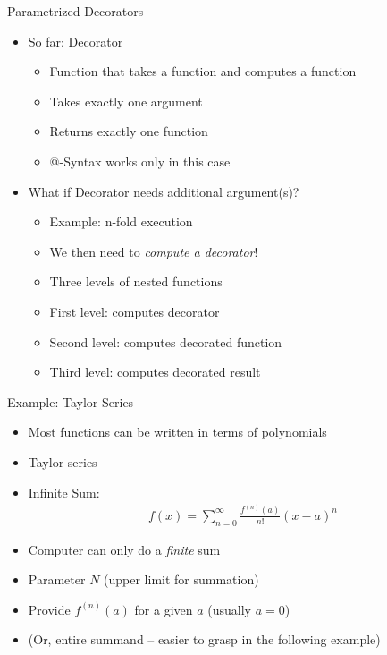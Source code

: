 \begin{frame}[fragile]{Parametrized Decorators}
%
\begin{itemize}
\item So far: Decorator
	\begin{itemize}
	\item Function that takes a function and computes a function
	\item Takes exactly one argument
	\item Returns exactly one function
	\item @-Syntax works only in this case
	\end{itemize}
\item What if Decorator needs additional argument(s)?
	\begin{itemize}
	\item Example: n-fold execution
	\item We then need to \emph{compute a decorator}!
	\item Three levels of nested functions
	\item First level: computes decorator
	\item Second level: computes decorated function
	\item Third level: computes decorated result
	\end{itemize}
\end{itemize}
%
\end{frame}


\begin{frame}[fragile]{Example: Taylor Series}
%
\begin{itemize}
\item Most functions can be written in terms of polynomials
\item[\Thus] Taylor series
\item Infinite Sum:
	\begin{align*}
	f(x) = \sum_{n=0}^{\infty} \frac{f^{(n)}(a)}{n!} (x - a)^n
	\end{align*}
\item Computer can only do a \emph{finite} sum
\item[\Thus] Parameter $N$ (upper limit for summation)
\item Provide $f^{(n)}(a)$ for a given $a$ (usually $a = 0$)
\item (Or, entire summand -- easier to grasp in the following example)
\end{itemize}
%
\end{frame}


